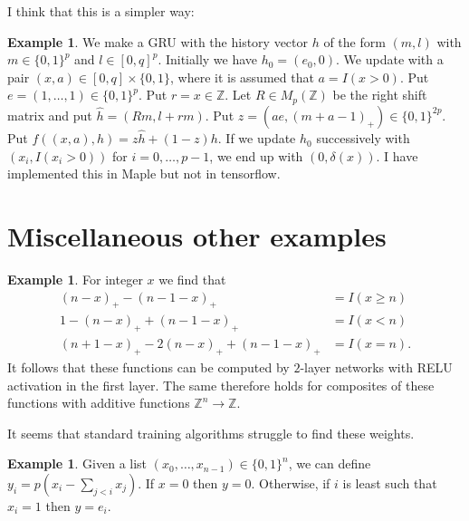 \documentclass{amsart}
\newcommand{\Z}         {{\mathbb{Z}}}
\newcommand{\dl}        {\delta}
\newcommand{\tm}        {\times}
\renewcommand{\:}{\colon}
\theoremstyle{definition}
\newtheorem{example}[theorem]{Example}
\begin{document}
I think that this is a simpler way:
\begin{example}
 We make a GRU with the history vector $h$ of the form $(m,l)$ with
 $m\in\{0,1\}^p$ and $l\in[0,q]^p$.  Initially we have $h_0=(e_0,0)$.
 We update with a pair $(x,a)\in[0,q]\tm\{0,1\}$, where it is assumed
 that $a=I(x>0)$.  Put $e=(1,\dotsc,1)\in\{0,1\}^p$.  Put
 $r=x\in\Z$.  Let $R\in M_p(\Z)$ be the right shift matrix
 and put $\widehat{h}=(Rm,l+rm)$.  Put
 $z=(ae,(m+a-1)_+)\in\{0,1\}^{2p}$.  Put
 $f((x,a),h)=z\widehat{h}+(1-z)h$.  If we update $h_0$ successively
 with $(x_i,I(x_i>0))$ for $i=0,\dotsc,p-1$, we end up with
 $(0,\dl(x))$.  I have implemented this in Maple but not in tensorflow.
\end{example}

\section{Miscellaneous other examples}

\begin{example}\label{eg-intervals}
 For integer $x$ we find that  
 \begin{align*}
  (n-x)_+ - (n-1-x)_+ &= I(x\geq n) \\
  1 - (n-x)_+ + (n-1-x)_+ &= I(x < n) \\
  (n+1-x)_+ - 2(n-x)_+ + (n-1-x)_+ &= I(x = n).
 \end{align*}
 It follows that these functions can be computed by $2$-layer networks
 with RELU activation in the first layer.  The same therefore holds
 for composites of these functions with additive functions
 $\Z^n\to\Z$.

 It seems that standard training algorithms struggle to find these
 weights. 
\end{example}

\begin{example}\label{eg-first}
 Given a list $(x_0,\dotsc,x_{n-1})\in\{0,1\}^n$, we can define
 $y_i=p\left(x_i-\sum_{j<i}x_j\right)$.  If $x=0$ then $y=0$.
 Otherwise, if $i$ is least such that $x_i=1$ then $y=e_i$.
\end{example}
\end{document}
